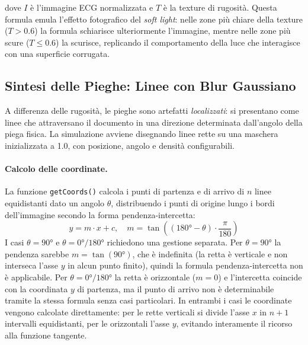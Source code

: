 dove $I$ è l'immagine ECG normalizzata e $T$ è la texture di rugosità. Questa formula emula l'effetto fotografico del \textit{soft light}: nelle zone più chiare della texture ($T > 0.6$) la formula schiarisce ulteriormente l'immagine, mentre nelle zone più scure ($T \leq 0.6$) la scurisce, replicando il comportamento della luce che interagisce con una superficie corrugata.

\subsection{Sintesi delle Pieghe: Linee con Blur Gaussiano}

A differenza delle rugosità, le pieghe sono artefatti \textit{localizzati}: si presentano come linee che attraversano il documento in una direzione determinata dall'angolo della piega fisica. La simulazione avviene disegnando linee rette su una maschera inizializzata a 1.0, con posizione, angolo e densità configurabili.

\paragraph{Calcolo delle coordinate.} La funzione \texttt{getCoords()} calcola i punti di partenza e di arrivo di $n$ linee equidistanti dato un angolo $\theta$, distribuendo i punti di origine lungo i bordi dell'immagine secondo la forma pendenza-intercetta:
\[
y = m \cdot x + c, \quad m = \tan\!\left((180° - \theta)\cdot\frac{\pi}{180}\right)
\]
I casi $\theta = 90°$ e $\theta = 0°/180°$ richiedono una gestione separata. Per $\theta = 90°$ la pendenza sarebbe $m = \tan(90°)$, che è indefinita (la retta è verticale e non interseca l'asse $y$ in alcun punto finito), quindi la formula pendenza-intercetta non è applicabile. Per $\theta = 0°/180°$ la retta è orizzontale ($m = 0$) e l'intercetta coincide con la coordinata $y$ di partenza, ma il punto di arrivo non è determinabile tramite la stessa formula senza casi particolari. In entrambi i casi le coordinate vengono calcolate direttamente: per le rette verticali si divide l'asse $x$ in $n+1$ intervalli equidistanti, per le orizzontali l'asse $y$, evitando interamente il ricorso alla funzione tangente.

